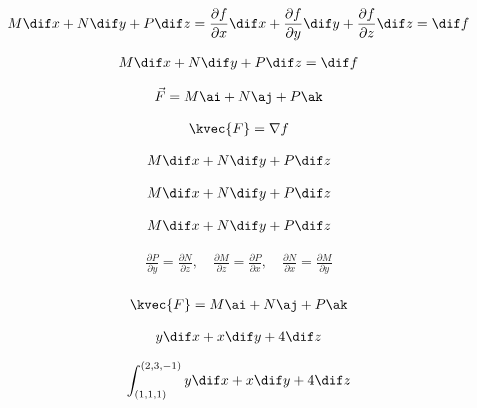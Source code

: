 \begin{align*}
M\dif x+N\dif y+P\dif z=\frac{\partial{f}}{\partial{x}}\dif x+\frac{\partial{f}}{\partial{y}}\dif y+\frac{\partial{f}}{\partial{z}}\dif z=\dif f\\
\end{align*}

\begin{align*}
M\dif x+N\dif y+P\dif z=\dif f\\
\end{align*}

\begin{align*}
\vec{F}=M\ai+N\aj+P\ak\\
\end{align*}

\begin{align*}
\kvec{F}=\nabla f\\
\end{align*}

\begin{align*}
M\dif x+N\dif y+P\dif z\\
\end{align*}

\begin{align*}
M\dif x+N\dif y+P\dif z\\
\end{align*}

\begin{align*}
M\dif x+N\dif y+P\dif z\\
\end{align*}

\begin{align*}
\frac{\partial{P}}{\partial{y}}=\frac{\partial{N}}{\partial{z}},\quad\frac{\partial{M}}{\partial{z}}=\frac{\partial{P}}{\partial{x}},\quad\frac{\partial{N}}{\partial{x}}=\frac{\partial{M}}{\partial{y}}\\
\end{align*}

\begin{align*}
\kvec{F}=M\ai+N\aj+P\ak\\
\end{align*}

\begin{align*}
y\dif x+x\dif y+4\dif z\\
\end{align*}

\begin{align*}
\int_{(1,1,1)}^{(2,3,-1)}y\dif x+x\dif y+4\dif z\\
\end{align*}

